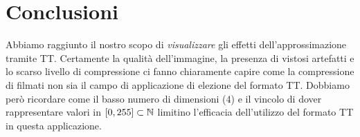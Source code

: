 \documentclass[11pt,a4paper]{article}
\begin{document}


\section{Conclusioni}
Abbiamo raggiunto il nostro scopo di \emph{visualizzare} gli effetti dell'approssimazione tramite TT. Certamente la qualità dell'immagine, la presenza di vistosi artefatti e lo scarso livello di compressione ci fanno chiaramente capire come la compressione di filmati non sia il campo di applicazione di elezione del formato TT.
Dobbiamo però ricordare come il basso numero di dimensioni (4) e il vincolo di dover rappresentare valori in $[0,255]\subset\mathbb{N}$ limitino l'efficacia dell'utilizzo del formato TT in questa applicazione.

\end{document}
